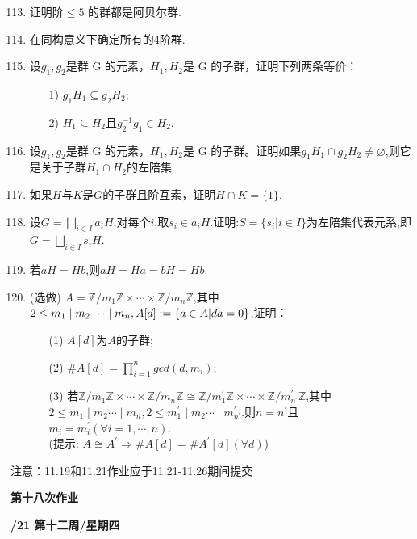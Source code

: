 \documentclass[a4paper,12pt]{article}
\begin{document}
\begin{enumerate}\setcounter{enumi}{112}
    \item 证明阶$\leq5$ 的群都是阿贝尔群.
    \item 在同构意义下确定所有的4阶群.
    \item 设$g_1,g_2$是群 G 的元素，$H_1,H_2$是 G 的子群，证明下列两条等价：
    \begin{enumerate}
\item[1)]$g_1H_1\subseteq g_2H_2;$
\item[2)]$H_1\subseteq H_2$且$g_2^{-1}g_1\in H_2$.
\end{enumerate}

\item 设$g_1,g_2$是群 G 的元素，$H_1,H_2$是 G 的子群。证明如果$g_1H_1\cap g_2H_2\neq\varnothing$,则它
是关于子群$H_1\cap H_2$的左陪集.
\item 如果$H$与$K$是$G$的子群且阶互素，证明$H\cap K=\{1\}$.
\item 设$G=\bigsqcup_{i\in I} a_{i}H$,对每个$i$,取$s_{i}\in a_{i}H$.证明:$S=\{s_{i}|i\in I\}$为左陪集代表元系,即$G=\bigsqcup_{i\in I} s_{i}H$.
\item 若$aH=Hb$,则$aH=Ha=bH=Hb$.
\item {\color{red} (选做)} $A=\mathbb{Z}/m_{1}\mathbb{Z}\times\cdots\times \mathbb{Z}/m_{n}\mathbb{Z}$,其中$2\leq m_{1}\mid m_{2}\cdots\mid m_{n},\\
A[d]:=\left\{a\in A|da=0\right\}$,证明：
\begin{enumerate}
    \item[(1)] $A[d]$为$A$的子群;
    \item[(2)] $\# A[d]=\prod_{i=1}^{n}gcd(d,m_{i})$;
    \item[(3)] 若$\mathbb{Z}/m_{1}\mathbb{Z}\times\cdots\times \mathbb{Z}/m_{n}\mathbb{Z}\cong \mathbb{Z}/m_{1}^{'} \mathbb{Z}\times\cdots\times \mathbb{Z}/m_{n^{'}}^{'} \mathbb{Z}$,其中$2\leq m_{1}\mid m_{2}\cdots\mid m_{n},2\leq m_{1}^{'}\mid m_{2}^{‘}\cdots\mid m_{n^{'}}^{'}$.则$n=n^{'}$且$m_i=m_i^{'}(\forall i=1,\cdots,n)$.\\
    (\color{blue}提示: $A\cong A^{'}\Rightarrow \# A[d]=\# A^{'}[d](\forall d)$)
\end{enumerate}

\end{enumerate}

{\color{red} 注意：11.19和11.21作业应于11.21-11.26期间提交} 



\newpage
\head

\begin{center} %
	{\Large \bf 第十八次作业} %
	\vspace{2mm}
	
	{\bf{}/21 \quad  第十二周/星期四} %
\end{center} 
\end{document}
